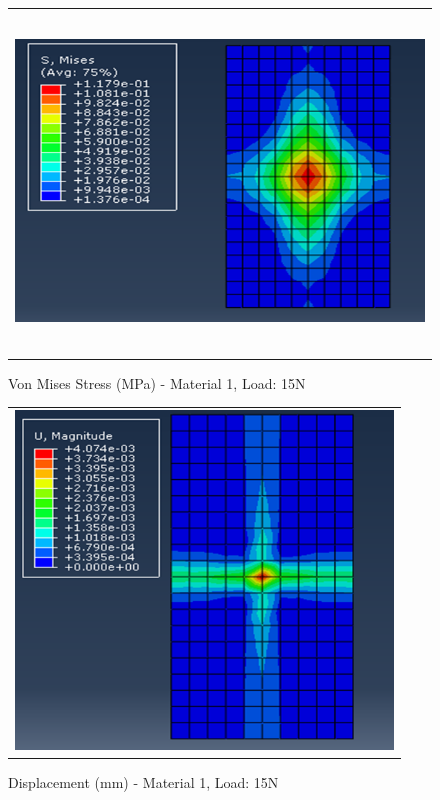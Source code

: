 \documentclass[a4paper,12pt]{article}
\numberwithin{equation}{section}
\numberwithin{figure}{section}
\begin{document}
\begin{figure}[H]
  \centering
  \begin{tabular}{@{}c@{}}
    \includegraphics[width=0.7\linewidth,height=255pt]{Results/Point Loading/M1_VMS_L3.png} \\
  \end{tabular}
  \caption{Von Mises Stress (MPa) - Material 1, Load: 15N}
\end{figure}

\begin{figure}[H]
  \centering
  \begin{tabular}{@{}c@{}}
    \includegraphics[width=0.7\linewidth,height=255pt]{Results/Point Loading/M1_DIS_L3.png} \\
  \end{tabular}
  \caption{Displacement (mm) - Material 1, Load: 15N}
\end{figure}
\end{document}
